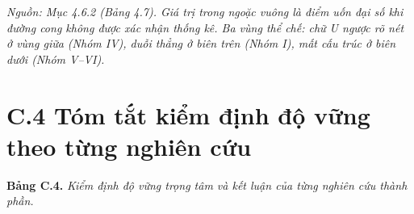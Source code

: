 \documentclass[
  a4paper,
  13pt]{extreport}
\begin{document}
\emph{Nguồn: Mục 4.6.2 (Bảng 4.7). Giá trị trong ngoặc vuông là điểm uốn
đại số khi đường cong không được xác nhận thống kê. Ba vùng thể chế: chữ
U ngược rõ nét ở vùng giữa (Nhóm IV), duỗi thẳng ở biên trên (Nhóm I),
mất cấu trúc ở biên dưới (Nhóm V--VI).}

\hypertarget{c.4-tuxf3m-tux1eaft-kiux1ec3m-ux111ux1ecbnh-ux111ux1ed9-vux1eefng-theo-tux1eebng-nghiuxean-cux1ee9u}{%
\section{C.4 Tóm tắt kiểm định độ vững theo từng nghiên
cứu}\label{c.4-tuxf3m-tux1eaft-kiux1ec3m-ux111ux1ecbnh-ux111ux1ed9-vux1eefng-theo-tux1eebng-nghiuxean-cux1ee9u}}

\textbf{Bảng C.4.} \emph{Kiểm định độ vững trọng tâm và kết luận của
từng nghiên cứu thành phần.}
\end{document}
